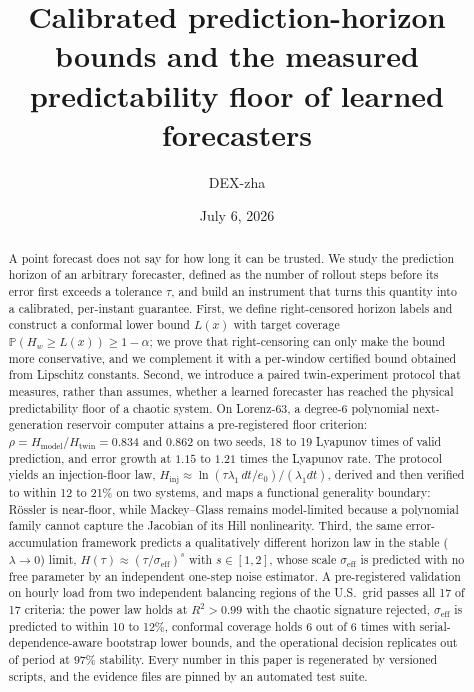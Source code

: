 \documentclass[aps,pre,twocolumn,superscriptaddress,nofootinbib,longbibliography]{revtex4-2}
\newcommand{\Hw}{H_w}
\newcommand{\eff}{\mathrm{eff}}
\begin{document}
\title{Calibrated prediction-horizon bounds and the measured
predictability floor of learned forecasters}

\author{DEX-zha}

\date{July 6, 2026}

\begin{abstract}
A point forecast does not say for how long it can be trusted. We study the
prediction horizon of an arbitrary forecaster, defined as the number of
rollout steps before its error first exceeds a tolerance $\tau$, and build
an instrument that turns this quantity into a calibrated, per-instant
guarantee. First, we define right-censored horizon labels and construct a
conformal lower bound $L(x)$ with target coverage
$\mathbb{P}(\Hw \ge L(x)) \ge 1-\alpha$; we prove that right-censoring can
only make the bound more conservative, and we complement it with a
per-window certified bound obtained from Lipschitz constants. Second, we
introduce a paired twin-experiment protocol that measures, rather than
assumes, whether a learned forecaster has reached the physical
predictability floor of a chaotic system. On Lorenz-63, a degree-6
polynomial next-generation reservoir computer attains a pre-registered
floor criterion: $\rho = H_{\mathrm{model}}/H_{\mathrm{twin}} = 0.834$ and
$0.862$ on two seeds, 18 to 19 Lyapunov times of valid prediction, and
error growth at $1.15$ to $1.21$ times the Lyapunov rate. The protocol
yields an injection-floor law, $H_{\mathrm{inj}} \approx
\ln(\tau\lambda_1\,dt/e_0)/(\lambda_1 dt)$, derived and then verified to
within 12 to 21\% on two systems, and maps a functional generality
boundary: R\"ossler is near-floor, while Mackey--Glass remains
model-limited because a polynomial family cannot capture the Jacobian of
its Hill nonlinearity. Third, the same error-accumulation framework
predicts a qualitatively different horizon law in the stable
($\lambda \to 0$) limit, $H(\tau) \approx (\tau/\sigma_\eff)^s$ with
$s \in [1,2]$, whose scale $\sigma_\eff$ is predicted with no free
parameter by an independent one-step noise estimator. A pre-registered
validation on hourly load from two independent balancing regions of the
U.S.\ grid passes all 17 of 17 criteria: the power law holds at
$R^2 > 0.99$ with the chaotic signature rejected, $\sigma_\eff$ is
predicted to within 10 to 12\%, conformal coverage holds 6 out of 6 times
with serial-dependence-aware bootstrap lower bounds, and the operational
decision replicates out of period at 97\% stability. Every number in this
paper is regenerated by versioned scripts, and the evidence files are
pinned by an automated test suite.
\end{abstract}
\end{document}

